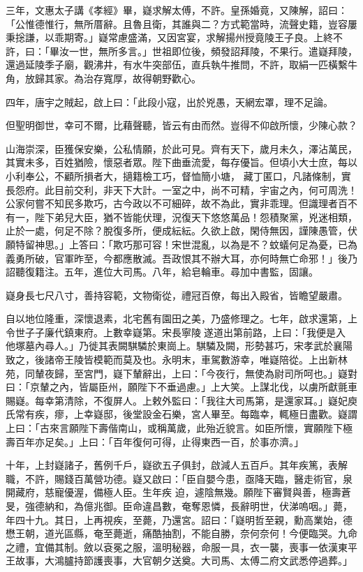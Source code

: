 \begin{pinyinscope}
 三年，文惠太子講《孝經》畢，嶷求解太傅，不許。皇孫婚竟，又陳解，詔曰：「公惟德惟行，無所厝辭。且魯且衛，其誰與二？方式範當時，流聲史籍，豈容屢秉捴謙，以乖期寄。」嶷常慮盛滿，又因宮宴，求解揚州授竟陵王子良。上終不許，曰：「畢汝一世，無所多言。」世祖即位後，頻發詔拜陵，不果行。遣嶷拜陵，還過延陵季子廟，觀沸井，有水牛突部伍，直兵執牛推問，不許，取絹一匹橫繫牛角，放歸其家。為治存寬厚，故得朝野歡心。



 四年，唐宇之賊起，啟上曰：「此段小寇，出於兇愚，天網宏罩，理不足論。



 但聖明御世，幸可不爾，比藉聲聽，皆云有由而然。豈得不仰啟所懷，少陳心款？



 山海崇深，臣獲保安樂，公私情願，於此可見。齊有天下，歲月未久，澤沾萬民，其實未多，百姓猶險，懷惡者眾。陛下曲垂流愛，每存優旨。但頃小大士庶，每以小利奉公，不顧所損者大，擿籍檢工巧，督恤簡小塘，
 藏丁匿口，凡諸條制，實長怨府。此目前交利，非天下大計。一室之中，尚不可精，宇宙之內，何可周洗！公家何嘗不知民多欺巧，古今政以不可細碎，故不為此，實非乖理。但識理者百不有一，陛下弟兒大臣，猶不皆能伏理，況復天下悠悠萬品！怨積聚黨，兇迷相類，止於一處，何足不除？脫復多所，便成紜紜。久欲上啟，閑侍無因，謹陳愚管，伏願特留神思。」上答曰：「欺巧那可容！宋世混亂，以為是不？蚊蟻何足為憂，已為義勇所破，官軍昨至，今都應散滅。吾政恨其不辦大耳，亦何時無亡命邪！」後乃詔聽復籍注。五年，進位大司馬。八年，給皂輪車。尋加中書監，固讓。



 嶷身長七尺八寸，善持容範，文物衛從，禮冠百僚，每出入殿省，皆瞻望嚴肅。



 自以地位隆重，深懷退素，北宅舊有園田之美，乃盛修理之。七年，啟求還第，上令世子子廉代鎮東府。上數幸嶷第。宋長寧陵遂道出第前路，上曰：「我便是入
 他塚墓內尋人。」乃徙其表闕騏驎於東崗上。騏驎及闕，形勢甚巧，宋孝武於襄陽致之，後諸帝王陵皆模範而莫及也。永明末，車駕數游幸，唯嶷陪從。上出新林苑，同輦夜歸，至宮門，嶷下輦辭出，上曰：「今夜行，無使為尉司所呵也。」嶷對曰：「京輦之內，皆屬臣州，願陛下不垂過慮。」上大笑。上謀北伐，以虜所獻氈車賜嶷。每幸第清除，不復屏人。上敕外監曰：「我往大司馬第，是還家耳。」嶷妃庾氏常有疾，瘳，上幸嶷邸，後堂設金石樂，宮人畢至。每臨幸，輒極日盡歡。嶷謂上曰：「古來言願陛下壽偕南山，或稱萬歲，此殆近貌言。如臣所懷，實願陛下極壽百年亦足矣。」上曰：「百年復何可得，止得東西一百，於事亦濟。」



 十年，上封嶷諸子，舊例千戶，嶷欲五子俱封，啟減人五百戶。其年疾篤，表解職，不許，賜錢百萬營功德。嶷又啟曰：「臣自嬰今患，亟降天臨，醫走術官，泉開藏府，慈寵優渥，備極人臣。生年疾
 迫，遽陰無幾。願陛下審賢與善，極壽蒼旻，強德納和，為億兆御。臣命違昌數，奄奪恩憐，長辭明世，伏涕嗚咽。」薨，年四十九。其日，上再視疾，至薨，乃還宮。詔曰：「嶷明哲至親，勳高業始，德懋王朝，道光區縣，奄至薨逝，痛酷抽割，不能自勝，奈何奈何！今便臨哭。九命之禮，宜備其制。斂以袞冕之服，溫明秘器，命服一具，衣一襲，喪事一依漢東平王故事，大鴻臚持節護喪事，大官朝夕送奠。大司馬、太傅二府文武悉停過葬。」




\end{pinyinscope}

